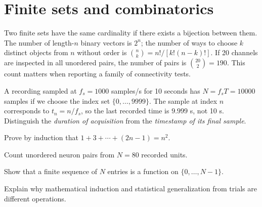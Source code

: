 \section{Finite sets and combinatorics}
Two finite sets have the same cardinality if there exists a bijection between them. The number of length-$n$ binary vectors is $2^n$; the number of ways to choose $k$ distinct objects from $n$ without order is $\binom nk=n!/[k!(n-k)!]$. If 20 channels are inspected in all unordered pairs, the number of pairs is $\binom{20}{2}=190$. This count matters when reporting a family of connectivity tests.

\begin{workedexample}
A recording sampled at $f_s=1000$ samples/s for 10 seconds has $N=f_sT=10000$ samples if we choose the index set $\{0,\ldots,9999\}$. The sample at index $n$ corresponds to $t_n=n/f_s$, so the last recorded time is $9.999$ s, not 10 s. Distinguish the \emph{duration of acquisition} from the \emph{timestamp of its final sample}.
\end{workedexample}
\begin{exercises}
\item Prove by induction that $1+3+\cdots+(2n-1)=n^2$.
\item Count unordered neuron pairs from $N=80$ recorded units.
\item Show that a finite sequence of $N$ entries is a function on $\{0,\ldots,N-1\}$.
\item Explain why mathematical induction and statistical generalization from trials are different operations.
\end{exercises}